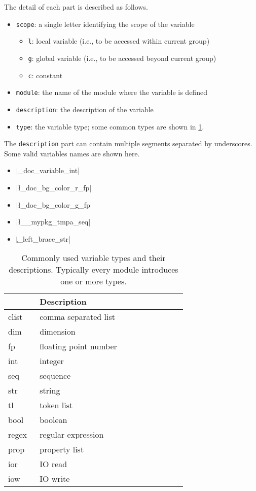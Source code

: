\documentclass{ltugboat}
\begin{document}
\vspace*{0.5\baselineskip}
\par\noindent The detail of each part is described as follows.
\begin{itemize}
\item \texttt{scope}: a single letter identifying the scope of the variable
\begin{itemize}
\item \texttt{l}: local variable (i.e., to be accessed within current group)
\item \texttt{g}: global variable (i.e., to be accessed beyond current group)
\item \texttt{c}: constant
\end{itemize}
\item \texttt{module}: the name of the module where the variable is defined
\item \texttt{description}: the description of the variable
\item \texttt{type}: the variable type; some common types are shown in \cref{tbl:var-type}.
\end{itemize}
The \texttt{description} part can contain multiple segments separated by underscores. 
Some valid variables names are shown here.
\begin{itemize}
\item \inltex|\g_doc_variable_int|
\item \inltex|\l_doc_bg_color_r_fp|
\item \inltex|\l_doc_bg_color_g_fp|
\item \inltex|\l__mypkg_tmpa_seq|
\item \inltex|\c_left_brace_str|
\end{itemize}


\begin{table}[htpb]
\centering
\begin{tabular}{>{\ttfamily\centering}p{0.15\linewidth}p{0.7\linewidth}}
\toprule
\multicolumn{1}{c}{Type} & Description\\ \midrule
clist & comma separated list\\
dim & dimension\\
fp & floating point number\\
int & integer\\
seq & sequence\\
str & string\\
tl & token list\\
bool & boolean\\
regex & regular expression\\
prop & property list\\
ior & IO read\\
iow & IO write\\ \bottomrule
\end{tabular}
\caption{Commonly used variable types and their descriptions. Typically every \LTT{} module introduces one or more types.}
\label{tbl:var-type}
\end{table}
\end{document}
